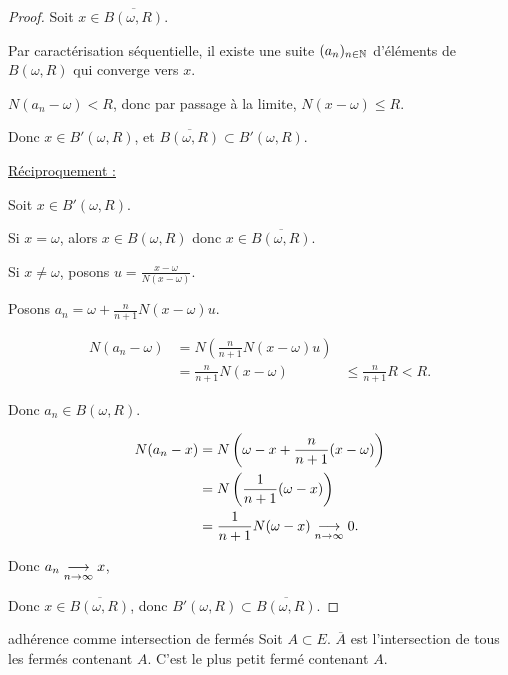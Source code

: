 \begin{proof}
    Soit $x \in \overline{B(\omega, R)}$.

    Par caractérisation séquentielle, il existe une suite $(a_n)_{n \in \mathbb{N}}$ d'éléments de
    $B(\omega, R)$ qui converge vers $x$.

    $N(a_n - \omega) < R$, donc par passage à la limite, $N(x - \omega) \leqslant R$. 

    Donc $x \in B'(\omega, R)$, et $\overline{B(\omega, R)} \subset B'(\omega, R)$.

    \avspace \qquad \uline{Réciproquement : }

    \svspace Soit $x \in B'(\omega, R)$.

    Si $x = \omega$, alors $x \in B(\omega, R)$ donc $x \in \overline{B(\omega, R)}$.

    Si $x \neq \omega$, posons $u = \frac{x - \omega }{N(x - \omega)}$.

    Posons $a_n = \omega + \frac n {n + 1} N(x - \omega)u$. 

    \begin{align*}
        N(a_n - \omega) & = N\left( \frac n {n + 1} N(x - \omega) u \right) \\
        & = \frac n {n + 1} N(x - \omega) 
        & \leqslant \frac n {n + 1} R < R.  
    \end{align*}

    Donc $a_n \in B(\omega, R)$.

    \begin{align*}
        N(a_n - x) & = N\left( \omega - x + \frac n {n + 1} (x - \omega) \right) \\
        & = N\left( \frac 1 {n + 1}(\omega - x) \right) \\
        & = \frac 1 {n + 1} N(\omega - x) \underset{n \to \infty}{\longrightarrow} 0.
    \end{align*}

    Donc $a_n \underset{n \to \infty}{\longrightarrow} x$, 

    Donc $x \in \overline{B(\omega, R)}$, donc $B'(\omega, R) \subset \overline{B(\omega, R)}$.
\end{proof}

\begin{theoreme}{adhérence comme intersection de fermés}{}
    Soit $A \subset E$.
    $\overline{A}$ est l'intersection de tous les fermés contenant $A$.
    C'est le plus petit fermé contenant $A$.
\end{theoreme}


